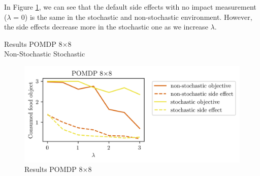 \documentclass[12pt,A4]{report}
\theoremstyle{definition}
\begin{document}
In Figure \ref{fig:results_pomdp_8x8}, we can see that the default side effects with no impact measurement ($\lambda$ = 0) is the same in the stochastic and non-stochastic environment. However, the side effects decrease more in the stochastic one as we increase $\lambda$. 






\begin{table}[H]
  \centering
  \caption{Results POMDP 8$\times$8\\ Non-Stochastic \hspace{130pt} Stochastic}
  \vspace{-10pt}
  
  
  \label{tab:results_pomdp_8x8}
\end{table}



\begin{figure}[H]
  \centering
  \includegraphics{"./figures/pomdp_8x8_result_plot.png"}
  \caption{Results POMDP 8$\times$8 }
  \label{fig:results_pomdp_8x8}
\end{figure}
\end{document}
